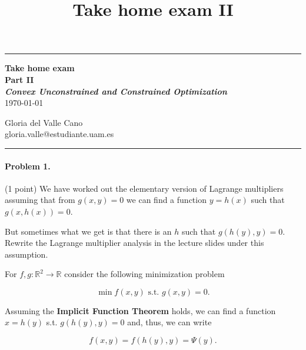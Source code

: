 \documentclass[12pt]{scrartcl}
\title{Take home exam II}
\begin{document}
\begin{center}
	\hrule
	\vspace{.4cm}
	{\textbf { \large \textbf{Take home exam} \\ Part II \\ \vspace{1em} \textit{Convex Unconstrained and Constrained Optimization}} \\ \vspace{0.5em}\today}
\end{center}

\begin{center}
{ \vspace{0.5em} Gloria del Valle Cano \hspace{\fill}   \\}
{ gloria.valle@estudiante.uam.es \hspace{\fill} \\ \vspace{1.5em}}
	\hrule
\end{center}



\begin{boxF}
\paragraph*{Problem 1.}(1 point) \hspace{0.15em} We have worked out the elementary version of Lagrange multipliers assuming that from $g(x, y) = 0$ we can find a function $y = h(x)$ such that $g(x, h(x)) = 0$. 

But sometimes what we get is that there is an $h$ such that $g(h(y), y) = 0$. Rewrite the Lagrange multiplier analysis in the lecture slides under this assumption.
\end{boxF}

For $f,g: \mathbb{R}^2 \to \mathbb{R}$ consider the following minimization problem

\begin{equation*}
    \min f(x, y) \mbox{ s.t. } g(x, y) = 0.
\end{equation*}

Assuming the \textbf{Implicit Function Theorem} holds, we can find a function $x = h(y)$ s.t. $g(h(y), y) = 0$ and, thus, we can write

\begin{equation*}
    f(x, y) = f(h(y), y) = \Psi(y).
\end{equation*}
\end{document}
